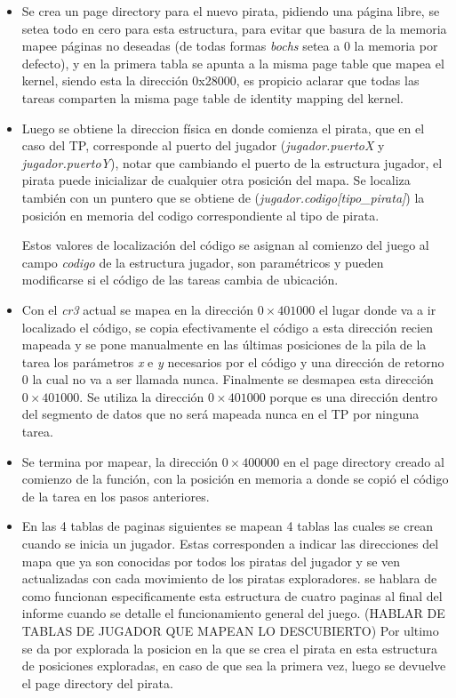 \begin{itemize}
\item Se crea un page directory para el nuevo pirata, pidiendo una página libre, se
setea todo en cero para esta estructura, para evitar que basura de la memoria
mapee páginas no deseadas (de todas formas {\it bochs\/} setea a 0 la memoria
por defecto), y en la primera tabla se apunta a la misma page table que mapea el
kernel, siendo esta la dirección 0x28000, es propicio aclarar que todas las
tareas comparten la misma page table de identity mapping del kernel.

\item Luego se obtiene la direccion física en donde comienza el pirata, que en
el caso del TP, corresponde al puerto del jugador
({\it jugador.puertoX\/} y {\it jugador.puertoY\/}), notar que cambiando el
puerto de la estructura jugador, el pirata puede inicializar de cualquier otra
posición del mapa. Se localiza también con un puntero que se obtiene de
({\it jugador.codigo[tipo_pirata]}) la posición en memoria del codigo
correspondiente al tipo de pirata.

Estos valores de localización del código se asignan al comienzo del juego al
campo {\it codigo\/} de la estructura jugador, son paramétricos y pueden
modificarse si el código de las tareas cambia de ubicación.

\item Con el {\it cr3\/} actual se mapea en la dirección $0\times401000$ el lugar
donde va a ir localizado el código, se copia efectivamente el código a esta
dirección recien mapeada y se pone manualmente en las últimas posiciones de la
pila de la tarea los parámetros {\it x\/} e {\it y\/} necesarios por el código y
una dirección de retorno 0 la cual no va a ser llamada nunca. Finalmente se
desmapea esta dirección $0\times401000$.
Se utiliza la dirección $0\times401000$ porque es una dirección dentro del
segmento de datos que no será mapeada nunca en el TP por ninguna tarea.

\item Se termina por mapear, la dirección $0\times400000$ en el page directory
creado al comienzo de la función, con la posición en memoria a donde se copió el
código de la tarea en los pasos anteriores.

\item En las 4 tablas de paginas siguientes se mapean 4 tablas las cuales se crean cuando se inicia un jugador.
Estas corresponden a indicar las direcciones del mapa que ya son conocidas por todos los piratas del jugador
y se ven actualizadas con cada movimiento de los piratas exploradores. se hablara de como funcionan especificamente
esta estructura de cuatro paginas al final del informe cuando se detalle el funcionamiento general del juego.   (HABLAR DE TABLAS DE JUGADOR QUE MAPEAN LO DESCUBIERTO)
Por ultimo se da por explorada la posicion en la que se crea el pirata en esta estructura de posiciones exploradas,
en caso de que sea la primera vez, luego se devuelve el page directory del pirata.
\end{itemize}


